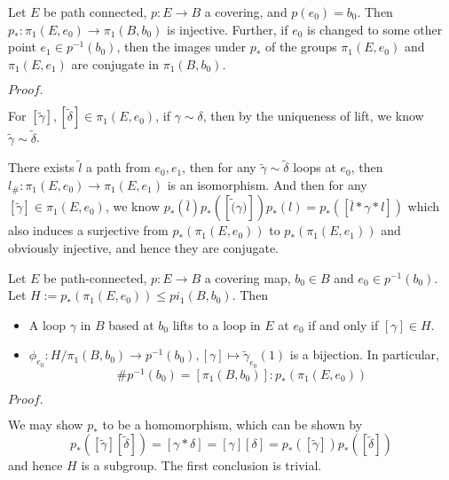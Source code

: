 \documentclass{article}
\newcommand{\Pf}[1]{$Proof.$\par}
\begin{document}
\begin{proposition}
    Let $E$ be path connected, $p:E\to B$ a covering, and $p(e_0) = b_0$. Then $p_*:\pi_1(E,e_0) \to \pi_1(B,b_0)$ is injective. Further, if $e_0$ is changed to some other point $e_1 \in p^{-1}(b_0)$, then the images under $p_*$ of the groups $\pi_1(E,e_0)$ and $\pi_1(E,e_1)$ are conjugate in $\pi_1(B,b_0)$.
\end{proposition}
\Pf\par
    For $[\widetilde{\gamma}],[\widetilde{\delta}] \in \pi_1(E,e_0)$, if $\gamma \sim \delta$, then by the uniqueness of lift, we know $\widetilde{\gamma} \sim \widetilde{\delta}$.\par
    There exists $\widetilde{l}$ a path from $e_0,e_1$, then for any $\widetilde{\gamma} \sim \widetilde{\delta}$ loops at $e_0$, then $l_{\#}:\pi_1(E,e_0) \to \pi_1(E,e_1)$ is an isomorphism. And then for any $[\widetilde{\gamma}] \in \pi_1(E,e_0)$, we know $p_*(\bar{l})p_*([\widetilde(\gamma)])p_*(l) = p_*([\bar{l}*\gamma*l])$ which also induces a surjective from $p_*(\pi_1(E,e_0))$ to $p_*(\pi_1(E,e_1))$ and obviously injective, and hence they are conjugate. 

\begin{theorem}
    Let $E$ be path-connected, $p:E\to B$ a covering map, $b_0 \in B$ and $e_0 \in p^{-1}(b_0)$. Let $H:= p_*(\pi_1(E,e_0)) \leq pi_1(B,b_0)$. Then
    \begin{itemize}
        \item A loop $\gamma$ in $B$ based at $b_0$ lifts to a loop in $E$ at $e_0$ if and only if $[\gamma] \in H$.\par
        \item $\phi_{e_0}:H/\pi_1(B,b_0)\to p^{-1}(b_0), [\gamma] \mapsto \widetilde{\gamma}_{e_0}(1)$ is a bijection. In particular,
        \[\# p^{-1}(b_0) = [\pi_1(B,b_0)]:p_*(\pi_1(E,e_0))\]
    \end{itemize}
\end{theorem} 
\Pf\par
    We may show $p_*$ to be a homomorphism, which can be shown by
    \[p_*([\widetilde{\gamma}][\widetilde{\delta}]) = [\gamma*\delta] = [\gamma][\delta] =p_*([\widetilde{\gamma}])p_*([\widetilde{\delta}])\]
    and hence $H$ is a subgroup. The first conclusion is trivial.\par
\end{document}
